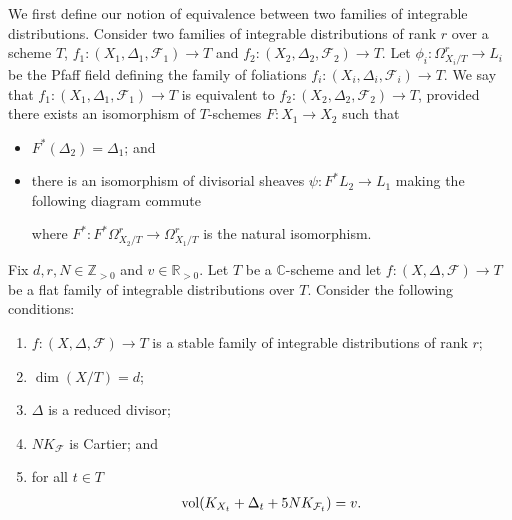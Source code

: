 \documentclass[12pt, a4paper]{amsart}
\theoremstyle{definition}
\theoremstyle{named}
\begin{document}
We first define our notion of equivalence between two families of integrable distributions. 
Consider two families of integrable distributions of rank $r$ over a scheme $T$, 
$f_1\colon (X_1, \Delta_1, \mathcal F_1) \to T$ and 
$f_2\colon (X_2, \Delta_2, \mathcal F_2) \to T$.  Let $\phi_i\colon \Omega^r_{X_i/T} \to L_i$ be the Pfaff field defining the family of foliations $f_i\colon (X_i, \Delta_i, \mathcal F_i) \to T$.
We say that $f_1 \colon (X_1, \Delta_1, \mathcal F_1) \to T$ is equivalent to $f_2 \colon (X_2, \Delta_2, \mathcal F_2) \to T$,  provided there exists an isomorphism of $T$-schemes
$F\colon X_1 \to X_2$ such that 
\begin{itemize}
    \item $F^*(\Delta_2) = \Delta_1$; and 
    \item there is an isomorphism of divisorial sheaves $\psi\colon F^*L_2 \to L_1$
    making the following diagram commute
    \begin{center}
    \end{center}
    where $F^*\colon F^*\Omega^r_{X_2/T} \to \Omega^r_{X_1/T}$ is the natural isomorphism.
\end{itemize}



Fix $d, r, N \in \mathbb Z_{>0}$ and $v \in \mathbb R_{>0}$. 
Let $T$ be a $\mathbb C$-scheme and let $f\colon (X, \Delta, \mathcal F) \to T$
be a flat family of integrable distributions over $T$.
Consider the following conditions:
\begin{enumerate}
    \item[(M1)] $f\colon (X, \Delta, \mathcal F) \to T$ is a stable family of integrable distributions of rank $r$; 
    \item[(M2)] $\dim (X/T) = d$;
    \item[(M3)] $\Delta$ is a reduced divisor;
    \item[(M4)] $NK_{\mathcal F}$ is Cartier; and 
    \item[(M5)] for all $t \in T$ 
    \begin{align*}{\rm vol}(K_{X_t}+\Delta_t+5NK_{\mathcal F_t})=v.\end{align*}
\end{enumerate}
\end{document}
